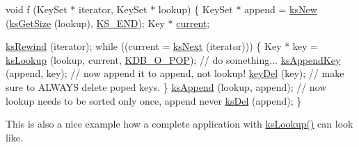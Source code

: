 \begin{DoxyCodeInclude}
\textcolor{keywordtype}{void} f (KeySet * iterator, KeySet * lookup)
\{
        KeySet * append = \hyperlink{group__keyset_ga671e1aaee3ae9dc13b4834a4ddbd2c3c}{ksNew} (\hyperlink{group__keyset_ga7474ad6b0a0fa969dbdf267ba5770eee}{ksGetSize} (lookup), \hyperlink{kdbenum_8c_a7a28fce3773b2c873c94ac80b8b4cd54}{KS\_END});
        Key * \hyperlink{classkdb_1_1KeySet_a0a0fc4efecd6dcbfde5fc35301b60349}{current};

        \hyperlink{group__keyset_gabe793ff51f1728e3429c84a8a9086b70}{ksRewind} (iterator);
        \textcolor{keywordflow}{while} ((current = \hyperlink{group__keyset_ga317321c9065b5a4b3e33fe1c399bcec9}{ksNext} (iterator)))
        \{
                Key * key = \hyperlink{group__keyset_gaa34fc43a081e6b01e4120daa6c112004}{ksLookup} (lookup, current, \hyperlink{group__keyset_gga98a3d6a4016c9dad9cbd1a99a9c2a45aa52fb5f2cc86773d393da62bebebf7984}{KDB\_O\_POP});
                \textcolor{comment}{// do something...}
                \hyperlink{group__keyset_gaa5a1d467a4d71041edce68ea7748ce45}{ksAppendKey} (append, key); \textcolor{comment}{// now append it to append, not lookup!}
                \hyperlink{group__key_ga3df95bbc2494e3e6703ece5639be5bb1}{keyDel} (key);                \textcolor{comment}{// make sure to ALWAYS delete poped keys.}
        \}
        \hyperlink{group__keyset_ga21eb9c3a14a604ee3a8bdc779232e7b7}{ksAppend} (lookup, append);
        \textcolor{comment}{// now lookup needs to be sorted only once, append never}
        \hyperlink{group__keyset_ga27e5c16473b02a422238c8d970db7ac8}{ksDel} (append);
\}
\end{DoxyCodeInclude}
 This is also a nice example how a complete application with \hyperlink{group__keyset_gaa34fc43a081e6b01e4120daa6c112004}{ks\+Lookup()} can look like.

